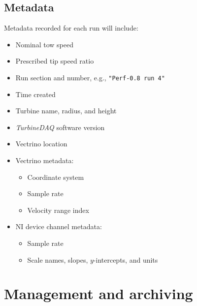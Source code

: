 \documentclass[12pt,letterpaper]{scrreprt}
\begin{document}
\subsection{Metadata}

Metadata recorded for each run will include:

\begin{itemize}

	\item Nominal tow speed
	
	\item Prescribed tip speed ratio
	
	\item Run section and number, e.g., \texttt{"Perf-0.8 run 4"}
	
	\item Time created
	
	\item Turbine name, radius, and height
	
	\item \textit{TurbineDAQ} software version
	
	\item Vectrino location
	
	\item Vectrino metadata:
	
		\begin{itemize}
		
			\item Coordinate system
			
			\item Sample rate
			
			\item Velocity range index
		
		\end{itemize}
		
	\item NI device channel metadata:
	
		\begin{itemize}
		
		\item Sample rate
		
		\item Scale names, slopes, $y$-intercepts, and units 
		
		\end{itemize}

\end{itemize}


\section{Management and archiving}
\end{document}
